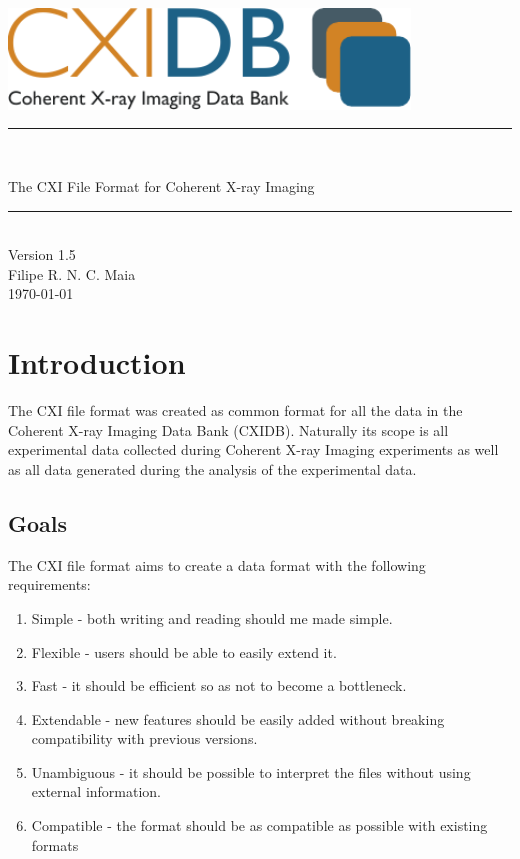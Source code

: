 \documentclass[usletter,11pt]{article}
\newcommand{\HRule}{{\color{brightOrange} \rule{\linewidth}{0.5mm}}}
\begin{document}
\begin{center}
\vspace*{2.5cm}
\includegraphics[width=0.8\textwidth]{cxidb_logo_large.pdf}\\[2.0cm]

\HRule \\[0.6cm]
\begin{spacing}{2.0}
{\color{softBlue} \Huge \sffamily The CXI File Format for Coherent
 X-ray Imaging}\\[0.2cm]
\end{spacing}
\HRule \\[1.0cm]
{\Large \color{softBlue} \sffamily Version 1.5}\\[4.5cm]

{\Large \color{softBlue} \sffamily Filipe R. N. C. Maia}\\[0.3cm]
{\Large \color{softBlue} \sffamily \today}
\thispagestyle{empty}
\end{center}

\pagebreak

\thispagestyle{fancy}

\tableofcontents

\pagebreak



\setcounter{page}{1}

\section{Introduction}
The CXI file format was created as common format for all the data in the Coherent X-ray Imaging Data Bank (CXIDB).
Naturally its scope is all experimental data collected during Coherent X-ray Imaging experiments as well as all data generated during the analysis of the experimental data.

\subsection{Goals}
The CXI file format aims to create a data format with the following requirements:
\begin{enumerate}
\item{Simple - both writing and reading should me made simple.}
\item{Flexible - users should be able to easily extend it.}
\item{Fast - it should be efficient so as not to become a bottleneck.}
\item{Extendable - new features should be easily added without breaking compatibility with previous versions.}
\item{Unambiguous - it should be possible to interpret the files without using external information.}
\item{Compatible - the format should be as compatible as possible with existing formats}
\end{enumerate}
\end{document}
